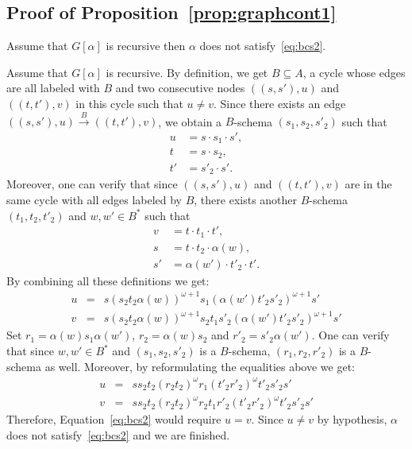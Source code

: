 \documentclass[envcountsame]{llncs}
\newcounter{sauvegarde}
\newcommand\adjustc[1]{\protect{\setcounter{sauvegarde}{\thetheorem}
  \setcounterref{theorem}{#1}
  \addtocounter{theorem}{-1}
}}
\newcommand\restorec{
\setcounter{theorem}{\thesauvegarde}
}
\begin{document}
\subsection{Proof of Proposition~\ref{prop:graphcont1}}

\adjustc{prop:graphcont1}
\begin{proposition}
  Assume that $G[\alpha]$ is recursive then $\alpha$ does not satisfy~\eqref{eq:bcs2}.
\end{proposition}
\restorec

Assume that $G[\alpha]$ is recursive. By definition, we get $B
\subseteq A$, a cycle whose edges are all labeled with $B$ and two
consecutive nodes $((s,s'),u)$ and $((t,t'),v)$ in this cycle such
that $u \neq v$. Since there exists an edge $((s,s'),u)
\xrightarrow{B} ((t,t'),v)$, we obtain a $B$-schema $(s_1,s_2,s'_2)$
such that
\begin{align*}
  u&=s \cdot s_1 \cdot s',\\
  t&=s \cdot s_2, \\
  t'&=s'_2 \cdot s'.
\end{align*}
Moreover, one can verify that since $((s,s'),u)$ and
$((t,t'),v)$ are in the same cycle with all edges labeled by $B$, there
exists another $B$-schema $(t_1,t_2,t'_2)$ and $w,w' \in B^*$ such
that
\begin{align*}
  v&=  t \cdot t_1 \cdot t',\\
  s&=t \cdot t_2 \cdot \alpha(w),\\
  s'&=\alpha(w') \cdot t'_2 \cdot t'.
\end{align*}
By combining all these
definitions we get: 
\begin{eqnarray*}
  u & = & s(s_2t_2\alpha(w))^{\omega+1} s_1 (\alpha(w')t'_2s'_2)^{\omega+1} s' \\
  v & = & s(s_2t_2\alpha(w))^{\omega+1} s_2t_1 s'_2(\alpha(w')t'_2s'_2)^{\omega+1} s'
\end{eqnarray*}
Set $r_1 = \alpha(w) s_1 \alpha(w')$, $r_2 = \alpha(w)s_2$ and $r'_2 =
s'_2\alpha(w')$. One can verify that since $w,w' \in B^*$ and
$(s_1,s_2,s'_2)$ is a $B$-schema, $(r_1,r_2,r'_2)$ is a $B$-schema as
well. Moreover, by reformulating the equalities above we get:
\begin{eqnarray*}
  u & = & ss_2t_2(r_2t_2)^\omega r_1 (t'_2r'_2)^\omega t'_2s'_2 s' \\
  v & = & ss_2t_2(r_2t_2)^\omega r_2t_1 r'_2(t'_2r'_2)^\omega t'_2s'_2s'
\end{eqnarray*}
Therefore, Equation~\eqref{eq:bcs2} would require $u = v$. Since $u
\neq v$ by hypothesis, $\alpha$ does not satisfy~\eqref{eq:bcs2} and we 
are finished.
\end{document}
